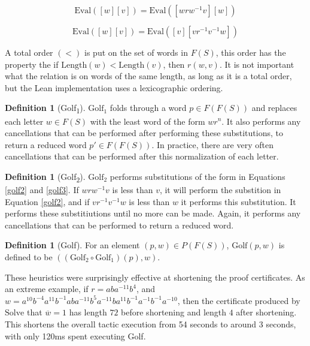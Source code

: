 \documentclass[12pt]{article} %
\theoremstyle{definition}
\theoremstyle{definition}
\theoremstyle{definition}
\theoremstyle{definition}
\theoremstyle{definition}
\newtheorem{defn}[theorem]{Definition}
\theoremstyle{definition}
\begin{document}
\begin{equation}\label{golf2}
  \text{Eval}([w][v]) = \text{Eval}([wrw^{-1}v][w])
\end{equation}

\begin{equation}\label{golf3}
  \text{Eval}([w][v]) = \text{Eval}([v][vr^{-1}v^{-1}w])
\end{equation}

A total order $(<)$ is put on the set of words in $F(S)$, this order has
the property the if $\text{Length}(w) < \text{Length}(v)$, then
$r(w,v)$. It is not important what the relation is on words of the same length,
as long as it is a total order, but the Lean implementation uses a lexicographic ordering.

\begin{defn}[Golf\textsubscript{1}]
$\text{Golf}_1$ folds through a word $p \in F(F(S))$ and replaces each
letter $w \in F(S)$ with the least word of the form $wr^n$.
It also performs any cancellations that can be performed after
performing these substitutions, to return a reduced word $p' \in F(F(S))$.
In practice, there are very often cancellations
that can be performed after this normalization of each letter.
\end{defn}

\begin{defn}[Golf\textsubscript{2}]
  $\text{Golf}_2$ performs substitutions of the form in Equations \ref{golf2} and
  \ref{golf3}. If $wrw^{-1}v$ is less than $v$, it will perform the substition
  in Equation \ref{golf2}, and if $vr^{-1}v^{-1}w$ is less than $w$ it performs
  this substitution. It performs these substitiutions until no more can be made.
  Again, it performs any cancellations that can be performed to return
  a reduced word.
\end{defn}

\begin{defn}[Golf]
  For an element $(p, w) \in P(F(S))$, $\text{Golf}(p, w)$ is defined to be
  $((\text{Golf}_2 \circ \text{Golf}_1)(p), w)$.
\end{defn}

These heuristics were surprisingly effective at shortening the proof certificates.
As an extreme example, if $r = aba^{-11}b^4$, and
$w = a^{10}b^{-4}a^{11}b^{-1}ab a^{-11} b^5a^{-11}b a^{11}b^{-1}a^{-1}b^{-1}a^{-10}$,
then the certificate produced by $\text{Solve}$ that $\overline{w} =1$
 has length $72$ before shortening and length $4$ after shortening.
 This shortens the overall tactic execution from 54 seconds to around
 3 seconds, with only 120ms spent executing Golf.
\end{document}
